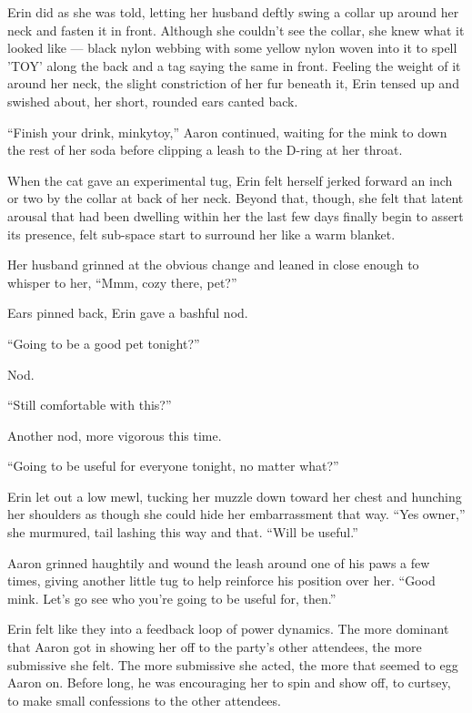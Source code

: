 Erin did as she was told, letting her husband deftly swing a collar up around her neck and fasten it in front. Although she couldn't see the collar, she knew what it looked like --- black nylon webbing with some yellow nylon woven into it to spell 'TOY' along the back and a tag saying the same in front. Feeling the weight of it around her neck, the slight constriction of her fur beneath it, Erin tensed up and swished about, her short, rounded ears canted back.

``Finish your drink, minkytoy,'' Aaron continued, waiting for the mink to down the rest of her soda before clipping a leash to the D-ring at her throat.

When the cat gave an experimental tug, Erin felt herself jerked forward an inch or two by the collar at back of her neck. Beyond that, though, she felt that latent arousal that had been dwelling within her the last few days finally begin to assert its presence, felt sub-space start to surround her like a warm blanket.

Her husband grinned at the obvious change and leaned in close enough to whisper to her, ``Mmm, cozy there, pet?''

Ears pinned back, Erin gave a bashful nod.

``Going to be a good pet tonight?''

Nod.

``Still comfortable with this?''

Another nod, more vigorous this time.

``Going to be useful for everyone tonight, no matter what?''

Erin let out a low mewl, tucking her muzzle down toward her chest and hunching her shoulders as though she could hide her embarrassment that way. ``Yes owner,'' she murmured, tail lashing this way and that. ``Will be useful.''

Aaron grinned haughtily and wound the leash around one of his paws a few times, giving another little tug to help reinforce his position over her. ``Good mink. Let's go see who you're going to be useful for, then.''

Erin felt like they into a feedback loop of power dynamics. The more dominant that Aaron got in showing her off to the party's other attendees, the more submissive she felt. The more submissive she acted, the more that seemed to egg Aaron on. Before long, he was encouraging her to spin and show off, to curtsey, to make small confessions to the other attendees.

